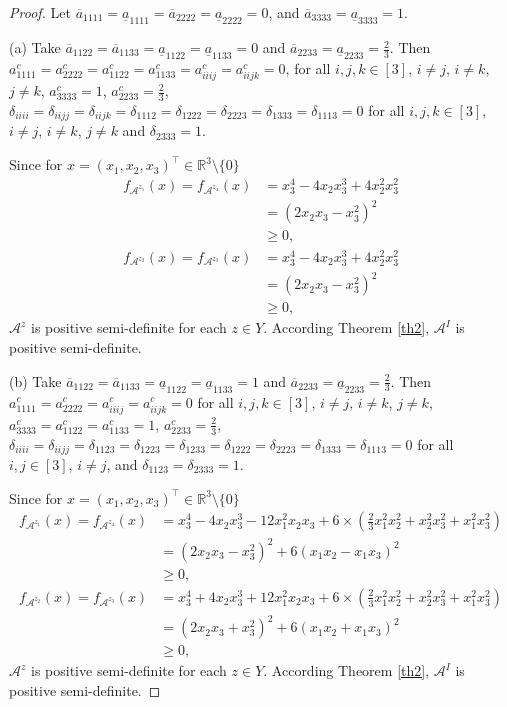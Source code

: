 \documentclass[twoside]{article}
\begin{document}
\begin{proof}
Let $\overline{a}_{1111}=\underline{a}_{1111}=\overline{a}_{2222}=\underline{a}_{2222}=0$, and $\overline{a}_{3333}=\underline{a}_{3333}=1$.

(a) Take $\overline{a}_{1122}=\overline{a}_{1133}=\underline{a}_{1122}=\underline{a}_{1133}=0$ and $\overline{a}_{2233}=\underline{a}_{2233}=\frac{2}{3}$. Then $a^c_{1111}=a^c_{2222}=a^c_{1122}=a^c_{1133}=a^c_{iiij}=a^c_{iijk}=0$, for all $i,j,k\in[3]$, $i\neq j$, $i\neq k$, $j\neq k$, $a^c_{3333}=1$, $a^c_{2233}=\frac{2}{3}$, $\delta_{iiii}=\delta_{iijj}=\delta_{iijk}=\delta_{1112}=\delta_{1222}=\delta_{2223}=\delta_{1333}=\delta_{1113}=0$ for all $i,j,k\in[3]$, $i\neq j$, $i\neq k$, $j\neq k$ and $\delta_{2333}=1$.

Since for $x=(x_1,x_2,x_3)^{\top}\in\mathbb{R}^3\setminus\{0\}$
\begin{align*}
  f_{\mathcal{A}^{z_1}}(x)=f_{\mathcal{A}^{z_4}}(x) &=x_3^4-4x_2x_3^3+4x_2^2x_3^2\\
  &=(2x_2x_3-x_3^2)^2\\
  &\geq0,
\end{align*}
\begin{align*}
  f_{\mathcal{A}^{z_2}}(x)=f_{\mathcal{A}^{z_3}}(x) &=x_3^4-4x_2x_3^3+4x_2^2x_3^2\\
  &=(2x_2x_3-x_3^2)^2\\
  &\geq0,
\end{align*}
$\mathcal{A}^z$ is positive semi-definite for each $z\in Y$. According Theorem \ref{th2}, $\mathcal{A}^I$ is positive semi-definite.


(b) Take $\overline{a}_{1122}=\overline{a}_{1133}=\underline{a}_{1122}=\underline{a}_{1133}=1$ and $\overline{a}_{2233}=\underline{a}_{2233}=\frac{2}{3}$. Then $a^c_{1111}=a^c_{2222}=a^c_{iiij}=a^c_{iijk}=0$ for all $i,j,k\in[3]$, $i\neq j$, $i\neq k$, $j\neq k$, $a^c_{3333}=a^c_{1122}=a^c_{1133}=1$, $a^c_{2233}=\frac{2}{3}$, $\delta_{iiii}=\delta_{iijj}=\delta_{1123}=\delta_{1223}=\delta_{1233}=\delta_{1222}=\delta_{2223}=\delta_{1333}=\delta_{1113}=0$ for all $i,j\in[3]$, $i\neq j$, and $\delta_{1123}=\delta_{2333}=1$.

Since for $x=(x_1,x_2,x_3)^{\top}\in\mathbb{R}^3\setminus\{0\}$
\begin{align*}
  f_{\mathcal{A}^{z_1}}(x)=f_{\mathcal{A}^{z_4}}(x) &=x_3^4-4x_2x_3^3-12x_1^2x_2x_3+6\times(\frac{2}{3}x_1^2x_2^2+x_2^2x_3^2+x_1^2x_3^2)\\
  &=(2x_2x_3-x_3^2)^2+6(x_1x_2-x_1x_3)^2\\
  &\geq0,
\end{align*}
\begin{align*}
  f_{\mathcal{A}^{z_2}}(x)=f_{\mathcal{A}^{z_3}}(x) &=x_3^4+4x_2x_3^3+12x_1^2x_2x_3+6\times(\frac{2}{3}x_1^2x_2^2+x_2^2x_3^2+x_1^2x_3^2)\\
  &=(2x_2x_3+x_3^2)^2+6(x_1x_2+x_1x_3)^2\\
  &\geq0,
\end{align*}
$\mathcal{A}^z$ is positive semi-definite for each $z\in Y$. According Theorem \ref{th2}, $\mathcal{A}^I$ is positive semi-definite.
\end{proof}
\end{document}

